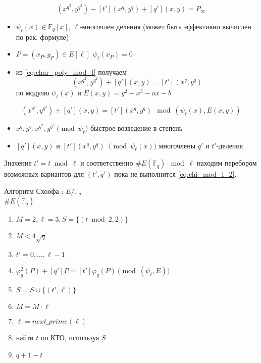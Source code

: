 \documentclass{beamer}
\begin{document}
\begin{frame}
\begin{equation}
    \label{eq:char_poly_mod_l}
(x^{q^2}, y^{q^2}) - [t'] (x^{q}, y^{q}) + [q'](x,y) = P_\infty
\end{equation}
\begin{itemize}
    \item $\psi_\ell(x) \in \mathbb{F}_q[x]$, $\ell$-многочлен деления (может быть эффективно вычислен по рек. формуле)
    \item $P = (x_P, y_P) \in E[\ell]$ \structure{$\iff$} $\psi_\ell(x_P) = 0$
    \item из \eqref{eq:char_poly_mod_l} получаем
    \[(x^{q^2}, y^{q^2}) + [q'](x,y) = [t'] (x^{q}, y^{q})\]
    по модулю $\psi_\ell(x)$ и $E(x,y) = y^2 - x^3 - a x - b$
\end{itemize}
\end{frame}

\begin{frame}
    \begin{equation}
    \label{eq:chi_mod_l_2}
    (x^{q^2}, y^{q^2}) + [q'](x,y) = [t'] (x^{q}, y^{q}) 
    ~\bmod (\psi_\ell(x), E(x,y))
    \end{equation}
    \begin{itemize}
        \item $x^q, y^q, x^{q^2}, y^{q^2} \pmod{\psi_\ell} $ \structure{$\implies$} быстрое возведение в степень 
        \item $[q'](x,y)$ и $[t'](x^q, y^q)$ $\pmod{\psi_\ell(x)}$ \structure{$\implies$} многочлены $q'$ и $t'$-деления
    \end{itemize}
    Значение $t' = t\bmod{\ell}$ и соответственно $\#E(\mathbb{F}_q)~\bmod{\ell}$ находим перебором возможных вариантов для $(t',q')$ пока не выполнится \eqref{eq:chi_mod_l_2}.
\end{frame}

\begin{frame}{Алгоритм Схоофа}
: $E/\mathbb{F}_q$\\
 $\#E(\mathbb{F}_q)$\\
\begin{enumerate}
    \item $M = 2, \ell = 3, S = \{(t \bmod{2}, 2)\}$
    \item {} $M < 4 \sqrt{q}$ 
    \item \quad {} $t' = 0, \ldots, \ell-1$ 
    \item \quad \quad {} $\varphi_q^2(P) + [q'] P = [t']\varphi_q(P) \pmod{(\psi_\ell, E)}$  \\
    \quad \quad \quad {}
    \item \quad $S = S \cup \{ (t',\ell) \}$
    \item \quad $M = M \cdot \ell$
    \item \quad $\ell = next\_prime(\ell)$
    \item найти $t$ по КТО, используя $S$
    \item {} $q + 1 - t$
\end{enumerate}
\end{frame}
\end{document}
